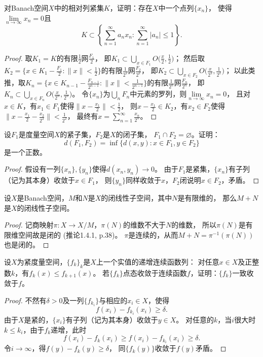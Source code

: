 \begin{10}[Grothendieck]
    对Banach空间$X$中的相对列紧集$K$，证明：存在$X$中一个点列$\{x_n\}$，
    使得$\lim\limits_{n\to\infty}x_n=0$且
    \[K\subset\left\{\sum_{n=1}^{\infty}a_nx_n:\sum_{n=1}^{\infty}|a_n|\leqslant1\right\}.\]
\end{10}
\begin{proof}
    取$K_1=K$的有限$\frac{1}{2}$网$\frac{F_1}{2}$，
    即$K_1\subset\bigcup\limits_{x \in F_1}O\big(\frac{x}{2},\frac{1}{2}\big)$；
    然后取$K_2=\big\{x \in K_1-\frac{F_1}{2}:\|x\|<\frac{1}{2}\big\}$的有限$\frac{1}{2^2}$网$\frac{F_2}{2^2}$，
    即$K_2\subset\bigcup\limits_{x \in F_2}O\big(\frac{x}{2^2},\frac{1}{2^2}\big)$；
    以此类推，取$K_n=\big\{x \in K_{n-1}-\frac{F_{n-1}}{2^{n-1}}:\|x\|<\frac{1}{2^{n-1}}\big\}$的有限$\frac{1}{2^n}$网$\frac{F_n}{2^n}$，
    即$K_n\subset\bigcup\limits_{x \in F_n}O\big(\frac{x}{2^n},\frac{1}{2^n}\big)$。
    令$\{x_n\}$为$\bigcup\limits_nF_n$中元素的罗列，则$\lim\limits_{n\to\infty}x_n=0$，
    且对$x \in K$，有$x_1 \in F_1$使得$\big\|x-\frac{x_1}{2}\big\|<\frac{1}{2}$，
    则$x-\frac{x_1}{2} \in K_2$，有$x_2 \in F_2$使得$\big\|x-\frac{x_1}{2}-\frac{x_2}{2^2}\big\|<\frac{1}{2^2}$，
    最终有$x=\sum\limits_{n=1}^{\infty}\frac{x_n}{2^n}$。
\end{proof}

\begin{13}
    设$F_1$是度量空间$X$的紧子集，$F_2$是$X$的闭子集，
    $F_1 \cap F_2=\varnothing$。证明：
    \[d(F_1,F_2)=\inf\{d(x,y):x\in F_1,y\in F_2\}\]
    是一个正数。
\end{13}
\begin{proof}
    假设有一列$\{x_n\},\{y_n\}$使得$d(x_n,y_n)\to0$。
    由于$F_1$是紧集，$\{x_n\}$有子列（记为其本身）收敛于$x \in F_1$，
    则$\{y_n\}$同样收敛于$x$，$F_2$闭说明$x \in F_2$，矛盾。
\end{proof}

\begin{14}
    设$X$是Banach空间，$M$和$N$是$X$的闭线性子空间，其中$N$是有限维的，
    那么$M+N$是$X$的闭线性子空间。
\end{14}
\begin{proof}
    记商映射$\pi\colon X\to X/M$，$\pi(N)$的维数不大于$N$的维数，
    所以$\pi(N)$是有限维空间故是闭的 (推论1.4.1, p.38)。
    $\pi$是连续的，从而$M+N=\pi^{-1}(\pi(N))$也是闭的。
\end{proof}

\begin{17}[Dini定理]
    设$X$为紧度量空间，$\{f_k\}_k$是$X$上一个实值的递增连续函数列：
    对任意$x \in X$及正整数$k$，有$f_k(x) \leqslant f_{k+1}(x)$。
    若$\{f_k\}$点态收敛于连续函数$f$，证明：$\{f_k\}$一致收敛于$f$。
\end{17}
\begin{proof}
    不然有$\delta>0$及一列$\{f_{k_i}\}$与相应的$x_i \in X$，使得
    \[f(x_i)-f_{k_i}(x_i)\geqslant\delta.\]
    由于$X$是紧的，$\{x_i\}$有子列（记为其本身）收敛于$y \in X$。
    对任意的$k$，当$i$很大时$k \leqslant k_i$，由于$f_k$递增，此时
    \[f(x_i)-f_k(x_i) \geqslant f(x_i)-f_{k_i}(x_i)\geqslant\delta.\]
    令$i\to\infty$，得$f(y)-f_k(y)\geqslant\delta$，
    同$\{f_k(y)\}$收敛于$f(y)$矛盾。
\end{proof}

